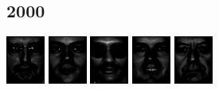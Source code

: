 \documentclass{article}
\begin{document}
\subsection{2000}
\includegraphics{imgs/k2000/out0.png}
\includegraphics{imgs/k2000/out1.png}
\includegraphics{imgs/k2000/out2.png}
\includegraphics{imgs/k2000/out3.png}
\includegraphics{imgs/k2000/out4.png}


\end{document}

